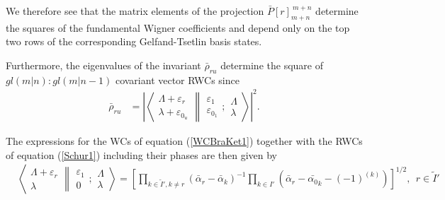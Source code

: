 \documentclass[12pt]{article}
\begin{document}
We therefore see that the matrix elements of the projection $\bar{P}[r]_{m+n}^{\ m+n}$ determine
the squares of the fundamental Wigner coefficients and depend only on the top two rows of the corresponding Gelfand-Tsetlin basis states.

Furthermore, the eigenvalues of the invariant $\bar{\rho}_{ru}$ determine the square of $gl(m|n):gl(m|n-1)$ covariant vector RWCs \cite{GIW2} since 
\begin{align}
\bar{\rho}_{ru}  &= \left| \left\langle
\begin{array}{c} \Lambda+\varepsilon_r\\ \lambda+\varepsilon_{0_u} \end{array}
\right\rVert
\left.
\begin{array}{c} \varepsilon_1 \\
\varepsilon_{0_1} \end{array} 
;
 \begin{array}{c} \Lambda \\
\lambda \end{array}
\right\rangle \right|^2.
\end{align}

The expressions for the WCs of equation (\ref{WCBraKet1}) together with the RWCs of equation (\ref{Schur1}) including their phases \cite{GIW2} are then given by
\begin{align}
& \left\langle 
\begin{array}{c} \Lambda+\varepsilon_r\\ \lambda
 \end{array}
\right\rVert
\left.
\begin{array}{c} \varepsilon_1 \\ 0 
 \end{array}
; \begin{array}{c} \Lambda \\ \lambda
 \end{array}
\right\rangle = \left[ \prod_{k\in \tilde{I}',k\neq r} \left(\bar{\alpha}_r - \bar{\alpha}_k\right)^{-1}\prod_{k\in
I'} \left(\bar{\alpha}_r - \bar{\alpha_0}_k - (-1)^{(k)}\right) \right]^{1/2}
,\ \ r\in \tilde{I}'
\end{align}
\end{document}
